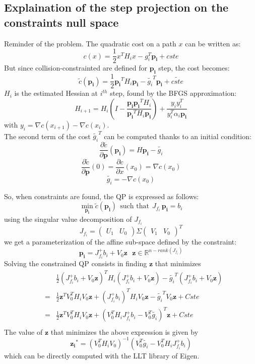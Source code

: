 \documentclass {article}
\newcommand\p{\mathbf{p_i}}
\newcommand\giT{\tilde{g_i}^T}
\newcommand\gi{\tilde{g_i}}
\newcommand\Jfi{J_{f_i}}
\newcommand\real{\mathbb{R}}
\begin{document}
\subsection{Explaination of the step projection on the constraints null space}
\label{section:lagoLLTSection}
Reminder of the problem.
The quadratic cost on a path $x$ can be written as:
$$
c(x) = \frac{1}{2}x^T H_i x - g_i^T\p + cste
$$
But since collision-constrainted are defined for $\p$ step, the cost becomes:
$$
\tilde{c}(\p)  = \frac{1}{2}\p^T H_i \p - \giT \p + \tilde{cste}
$$
$H_i$ is the estimated Hessian at $i^{th}$ step, found by the BFGS approximation:
$$ H_{i+1} = H_i(I - \frac{\p\p^T H_i}{\p^T H_i \p}) + \frac{y_i y_i^T}{y_i^T
\alpha_i\p}$$
with $ y_i = \nabla c(x_{i+1}) - \nabla c(x_i) $.\\
The second term of the cost $ \giT $ can be computed thanks to an initial
condition:
$$
\frac{\partial\tilde{c}}{\partial \mathbf{p}}(\p) = H\p-\gi
$$
$$
\frac{\partial\tilde{c}}{\partial \mathbf{p}}(0) = \frac{\partial c}
{\partial x}(x_0) = \nabla c(x_0)
$$
$$
\gi = -\nabla c(x_0)
$$

\vspace{0.4cm}

So, when constraints are found, the QP is expressed as follows:
$$
\min_{\p} \tilde{c}(\p) \ \ \mbox{such that}\ \ \Jfi\,\p=b_i
$$
using the singular value decomposition of $\Jfi$
$$
\Jfi = \left(\begin{array}{cc}U_1 & U_0\end{array}\right) \Sigma
\left(\begin{array}{cc}V_1 & V_0\end{array}\right)^T
$$
we get a parameterization of the affine sub-space defined by the constraint:
$$
\p = \Jfi^{+}b_i + V_0\mathbf{z}\ \ \ \mathbf{z}\in\real^{n-rank(\Jfi)}
$$
Solving the constrained QP consists in finding $\mathbf{z}$ that minimizes
\begin{eqnarray*}
&&\frac{1}{2}( \Jfi^{+}b_i + V_0\mathbf{z})^TH_i( \Jfi^{+}b_i + V_0\mathbf{z}) -
\giT( \Jfi^{+}b_i + V_0\mathbf{z})\\
&=& \frac{1}{2}\mathbf{z}^TV_0^TH_iV_0\mathbf{z} + {(\Jfi^{+}b_i)}^T H_i V_0
\mathbf{z} - \giT V_0\mathbf{z} + Cste \\
&=& \frac{1}{2}\mathbf{z}^TV_0^TH_iV_0\mathbf{z} + (V_0^T H_i \Jfi^{+}b_i  -
V_0^T\gi)^T\mathbf{z} + Cste \\
\end{eqnarray*}
The value of $\mathbf{z}$ that minimizes the above expression is given by
$$
\mathbf{z_i}^{*} = (V_0^TH_iV_0)^{-1}(V_0^T\gi  - V_0^T H_i \Jfi^{+}b_i)
$$
which can be directly computed with the LLT library of Eigen.
\end{document}
